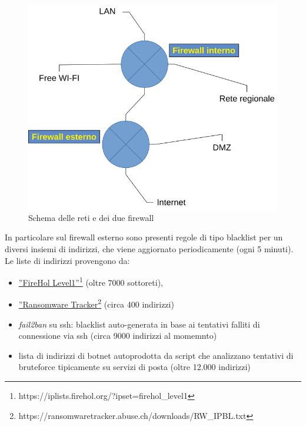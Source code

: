 \begin{figure}
\begin{center}
      \includegraphics[width=\linewidth]{rete.png}
      \caption{Schema delle reti e dei due firewall}
      \label{fig:rete}
\end{center}
\end{figure}

In particolare sul firewall esterno sono presenti regole di tipo blacklist per
un diversi insiemi di indirizzi, che viene aggiornato
periodicamente (ogni 5 minuti).  Le liste di indirizzi provengono da:

\begin{itemize}
    \item \href{https://iplists.firehol.org/?ipset=firehol\_level1}{''FireHol
    Level1''}\footnote{https://iplists.firehol.org/?ipset=firehol\_level1} (oltre
    7000 sottoreti),
    \item \href{https://ransomwaretracker.abuse.ch/downloads/RW\_IPBL.txt}{''Ransomware
    Tracker}\footnote{https://ransomwaretracker.abuse.ch/downloads/RW\_IPBL.txt}
    (circa 400 indirizzi)
    \item {\em fail2ban} su ssh: blacklist auto-generata in base ai tentativi
    falliti di connessione via ssh (circa 9000 indirizzi al momemnto)
    \item lista di indirizzi di botnet autoprodotta da script che analizzano
    tentativi di bruteforce tipicamente su servizi di posta (oltre 12.000
    indirizzi)
\end{itemize}
 
